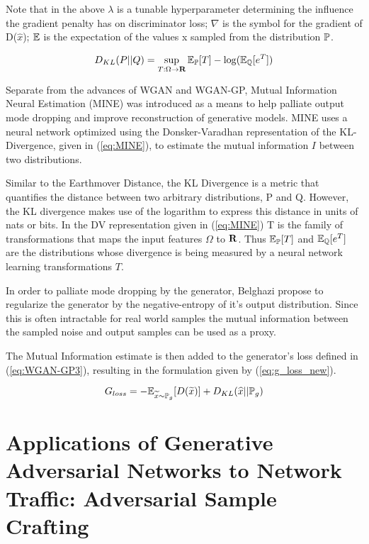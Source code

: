 Note that in the above $\lambda$ is a tunable hyperparameter determining the influence the gradient penalty has on discriminator loss; $\nabla$ is the symbol for the gradient of D($\widehat{x}$); $\E$ is the expectation of the values x sampled from the distribution $\P$.

\begin{equation}
	D_{KL}(P||Q) = \sup\limits_{T:\Omega \rightarrow \Reals} \E_\P[T] - \log(\E_\Q[e^T])
	\label{eq:MINE}
\end{equation}

Separate from the advances of WGAN and WGAN-GP, Mutual Information Neural Estimation (MINE) \cite{Belghazi2018} was introduced as a means to help palliate output mode dropping and improve reconstruction of generative models. MINE uses a neural network optimized using the Donsker-Varadhan representation of the KL-Divergence, given in (\ref{eq:MINE}), to estimate the mutual information $I$ between two distributions. 

Similar to the Earthmover Distance, the KL Divergence is a metric that quantifies the distance between two arbitrary distributions, P and Q. However, the KL divergence makes use of the logarithm to express this distance in units of nats or bits. In the DV representation given in (\ref{eq:MINE}) T is the family of transformations that maps the input features $\Omega$ to $\Reals$. Thus  $\E_\P[T]$ and $\E_\Q[e^T]$ are the distributions whose divergence is being measured by a neural network learning transformations $T$. 

In order to palliate mode dropping by the generator, Belghazi \etal \cite{Belghazi2018} propose to regularize the generator by the negative-entropy of it's output distribution. Since this is often intractable for real world samples the mutual information between the sampled noise and output samples can be used as a proxy.

The Mutual Information estimate is then added to the generator's loss defined in (\ref{eq:WGAN-GP3}), resulting in the formulation given by (\ref{eq:g_loss_new}).

\begin{equation}
G_{loss} =  -\E_{\widetilde{x} \sim \P_g}[D(\widetilde{x})] + D_{KL}(\widehat{x}||\P_g)
\label{eq:g_loss_new}
\end{equation}



\section{Applications of Generative Adversarial Networks to Network Traffic: Adversarial Sample Crafting}

